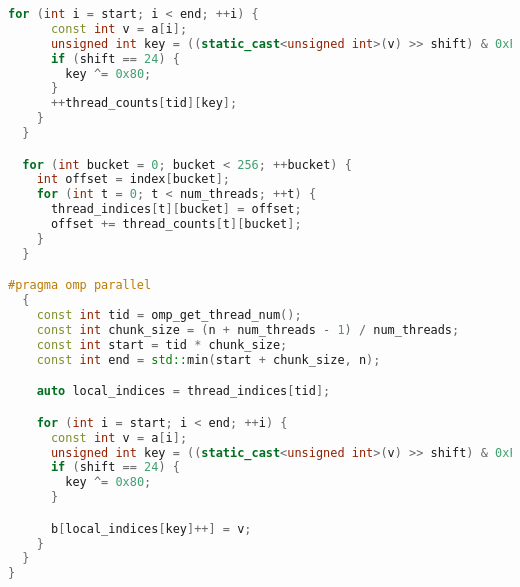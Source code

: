 \documentclass[12pt]{article}
\begin{document}
\begin{lstlisting}[language=C++]
    for (int i = start; i < end; ++i) {
      const int v = a[i];
      unsigned int key = ((static_cast<unsigned int>(v) >> shift) & 0xFFU);
      if (shift == 24) {
        key ^= 0x80;
      }
      ++thread_counts[tid][key];
    }
  }

  for (int bucket = 0; bucket < 256; ++bucket) {
    int offset = index[bucket];
    for (int t = 0; t < num_threads; ++t) {
      thread_indices[t][bucket] = offset;
      offset += thread_counts[t][bucket];
    }
  }

#pragma omp parallel
  {
    const int tid = omp_get_thread_num();
    const int chunk_size = (n + num_threads - 1) / num_threads;
    const int start = tid * chunk_size;
    const int end = std::min(start + chunk_size, n);

    auto local_indices = thread_indices[tid];

    for (int i = start; i < end; ++i) {
      const int v = a[i];
      unsigned int key = ((static_cast<unsigned int>(v) >> shift) & 0xFFU);
      if (shift == 24) {
        key ^= 0x80;
      }

      b[local_indices[key]++] = v;
    }
  }
}
\end{lstlisting}
\end{document}
